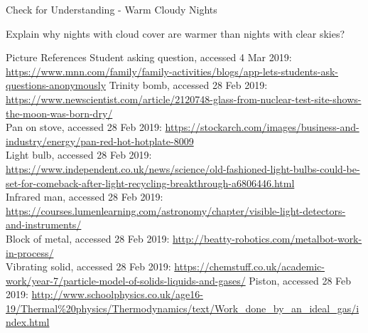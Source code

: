 \documentclass{beamer}
\begin{document}
\begin{frame}{Check for Understanding - Warm Cloudy Nights}
\begin{center}
   Explain why nights with cloud cover are warmer than nights with clear skies?
\end{center}
\end{frame}

\begin{frame}{Picture References}
\tiny
Student asking question, accessed 4 Mar 2019: \href{https://www.mnn.com/family/family-activities/blogs/app-lets-students-ask-questions-anonymously}{https://www.mnn.com/family/family-activities/blogs/app-lets-students-ask-questions-anonymously}
Trinity bomb, accessed 28 Feb 2019: \href{https://www.newscientist.com/article/2120748-glass-from-nuclear-test-site-shows-the-moon-was-born-dry/}{https://www.newscientist.com/article/2120748-glass-from-nuclear-test-site-shows-the-moon-was-born-dry/}\\
Pan on stove, accessed 28 Feb 2019: \href{https://stockarch.com/images/business-and-industry/energy/pan-red-hot-hotplate-8009}{https://stockarch.com/images/business-and-industry/energy/pan-red-hot-hotplate-8009}\\
Light bulb, accessed 28 Feb 2019: \href{https://www.independent.co.uk/news/science/old-fashioned-light-bulbs-could-be-set-for-comeback-after-light-recycling-breakthrough-a6806446.html}{https://www.independent.co.uk/news/science/old-fashioned-light-bulbs-could-be-set-for-comeback-after-light-recycling-breakthrough-a6806446.html}\\
Infrared man, accessed 28 Feb 2019: \href{https://courses.lumenlearning.com/astronomy/chapter/visible-light-detectors-and-instruments/}{https://courses.lumenlearning.com/astronomy/chapter/visible-light-detectors-and-instruments/}\\
Block of metal, accessed 28 Feb 2019: \href{http://beatty-robotics.com/metalbot-work-in-process/}{http://beatty-robotics.com/metalbot-work-in-process/}\\
Vibrating solid, accessed 28 Feb 2019: \href{https://chemstuff.co.uk/academic-work/year-7/particle-model-of-solids-liquids-and-gases/}{https://chemstuff.co.uk/academic-work/year-7/particle-model-of-solids-liquids-and-gases/}
Piston, accessed 28 Feb 2019: \href{http://www.schoolphysics.co.uk/age16-19/Thermal\%20physics/Thermodynamics/text/Work_done_by_an_ideal_gas/index.html}{http://www.schoolphysics.co.uk/age16-19/Thermal\%20physics/Thermodynamics/text/Work\_done\_by\_an\_ideal\_gas/index.html}\\

\end{frame}
\end{document}

